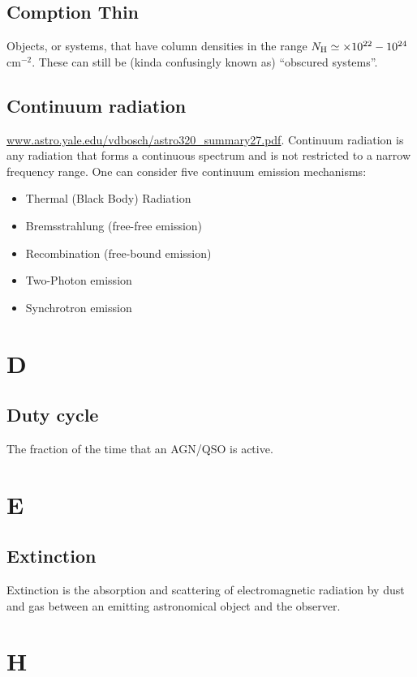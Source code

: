 \documentclass[11pt]{article}
\begin{document}
\subsection*{Comption Thin}
Objects, or systems, that have column densities in the range $N_{\rm H}
\simeq \times 10^{22} - 10^{24}$ cm$^{-2}$. These can still be 
(kinda confusingly known as) ``obscured systems''. 

\subsection*{Continuum radiation}
\href{www.astro.yale.edu/vdbosch/astro320\_summary27.pdf}{www.astro.yale.edu/vdbosch/astro320\_summary27.pdf}.
Continuum radiation is any radiation that forms a continuous spectrum and is not restricted to a narrow frequency range. One can consider five continuum emission mechanisms:
\begin{itemize}
\item Thermal (Black Body) Radiation
\item Bremsstrahlung (free-free emission)
\item Recombination (free-bound emission) 
\item Two-Photon emission
\item Synchrotron emission
\end{itemize}

    

\section*{D}
    \subsection*{Duty cycle}
    The fraction of the time that an AGN/QSO is active.

\section*{E}
    \subsection*{Extinction}
    Extinction is the absorption and scattering of electromagnetic
radiation by dust and gas between an emitting astronomical object and
the observer.

\section*{H}
\end{document}

